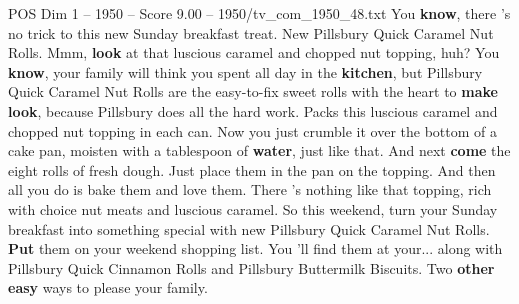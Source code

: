 \begin{textsample}{POS Dim 1 – 1950 – Score 9.00 – 1950/tv\_com\_1950\_48.txt}  \label{ex:f1_pos_013}
You \textbf{know}, there 's no trick to this new Sunday breakfast treat.
New Pillsbury Quick Caramel Nut Rolls.
Mmm, \textbf{look} at that luscious caramel and chopped nut topping, huh?
You \textbf{know}, your family will think you spent all day in the \textbf{kitchen}, but Pillsbury Quick Caramel Nut Rolls are the easy-to-fix sweet rolls with the heart to \textbf{make} \textbf{look}, because Pillsbury does all the hard work.
Packs this luscious caramel and chopped nut topping in each can.
Now you just crumble it over the bottom of a cake pan, moisten with a tablespoon of \textbf{water}, just like that.
And next \textbf{come} the eight rolls of fresh dough.
Just place them in the pan on the topping.
And then all you do is bake them and love them.
There 's nothing like that topping, rich with choice nut meats and luscious caramel.
So this weekend, turn your Sunday breakfast into something special with new Pillsbury Quick Caramel Nut Rolls. \textbf{Put} them on your weekend shopping list.
You 'll find them at your... along with Pillsbury Quick Cinnamon Rolls and Pillsbury Buttermilk Biscuits.
Two \textbf{other} \textbf{easy} ways to please your family.

\end{textsample}
